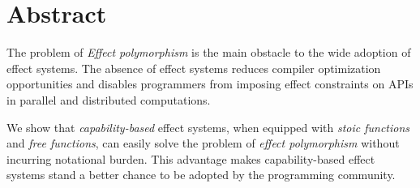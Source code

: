 \section*{\centering Abstract}

The problem of \emph{Effect polymorphism} is the main obstacle to the
wide adoption of effect systems. The absence of effect systems reduces
compiler optimization opportunities and disables programmers from
imposing effect constraints on APIs in parallel and distributed
computations.

We show that \emph{capability-based} effect systems, when equipped
with \emph{stoic functions} and \emph{free functions}, can easily
solve the problem of \emph{effect polymorphism} without incurring
notational burden. This advantage makes capability-based effect
systems stand a better chance to be adopted by the programming
community.
